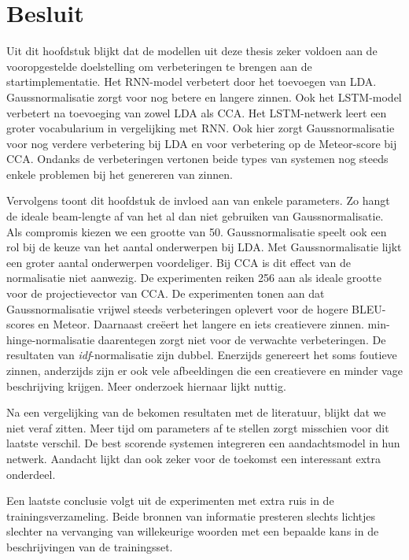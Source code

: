 
\section{Besluit} %
\label{sec:besluit}
Uit dit hoofdstuk blijkt dat de modellen uit deze thesis zeker voldoen aan de vooropgestelde doelstelling om verbeteringen te brengen aan de startimplementatie. Het RNN-model verbetert door het toevoegen van LDA. Gaussnormalisatie zorgt voor nog betere en langere zinnen.
Ook het LSTM-model verbetert na toevoeging van zowel LDA als CCA. Het LSTM-netwerk leert een groter vocabularium in vergelijking met RNN. Ook hier zorgt Gaussnormalisatie voor nog verdere verbetering bij LDA en voor verbetering op de Meteor-score bij CCA.
Ondanks de verbeteringen vertonen beide types van systemen nog steeds enkele problemen bij het genereren van zinnen.

Vervolgens toont dit hoofdstuk de invloed aan van enkele parameters. Zo hangt de ideale beam-lengte af van het al dan niet gebruiken van Gaussnormalisatie. Als compromis kiezen we een grootte van 50.
Gaussnormalisatie speelt ook een rol bij de keuze van het aantal onderwerpen bij LDA. Met Gaussnormalisatie lijkt een groter aantal onderwerpen voordeliger.
Bij CCA is dit effect van de normalisatie niet aanwezig. De experimenten reiken 256 aan als ideale grootte voor de projectievector van CCA.
De experimenten tonen aan dat Gaussnormalisatie vrijwel steeds verbeteringen oplevert voor de hogere BLEU-scores en Meteor. Daarnaast cre\"eert het langere en iets creatievere zinnen. min-hinge-normalisatie daarentegen zorgt niet voor de verwachte verbeteringen.
De resultaten van \emph{idf}-normalisatie zijn dubbel. Enerzijds genereert het soms foutieve zinnen, anderzijds zijn er ook vele afbeeldingen die een creatievere en minder vage beschrijving krijgen. Meer onderzoek hiernaar lijkt nuttig.

Na een vergelijking van de bekomen resultaten met de literatuur, blijkt dat we niet veraf zitten. Meer tijd om parameters af te stellen zorgt misschien voor dit laatste verschil. De best scorende systemen integreren een aandachtsmodel in hun netwerk. Aandacht lijkt dan ook zeker voor de toekomst een interessant extra onderdeel.

Een laatste conclusie volgt uit de experimenten met extra ruis in de trainingsverzameling. Beide bronnen van informatie presteren slechts lichtjes slechter na vervanging van willekeurige woorden met een bepaalde kans in de beschrijvingen van de trainingsset.


